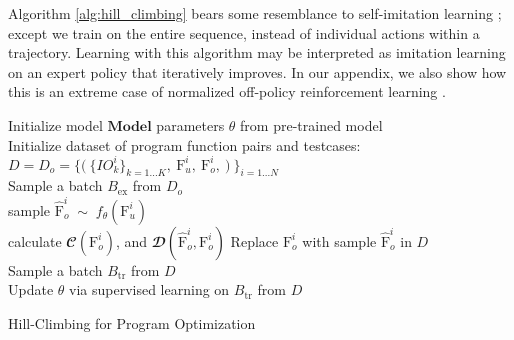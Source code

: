 \documentclass{article}
\begin{document}
Algorithm \ref{alg:hill_climbing} bears some resemblance to self-imitation learning \cite{oh2018self} ; except we train on the entire sequence, instead of individual actions within a trajectory. Learning with this algorithm may be interpreted as imitation learning on an expert policy that iteratively improves. In our appendix, we also show how this is an extreme case of normalized off-policy reinforcement learning . 

\begin{algorithm}
\label{alg:hill_climbing}
\begin{algorithmic}
\STATE Initialize model $\textbf{Model}$ parameters $\theta$ from pre-trained model \\
\STATE Initialize dataset of program function pairs and testcases: \\  
    $D = D_o =  \Big\{ \big( \
    \{IO_k^i\}_{k=1...K}, \
    \textrm{F}_{u}^i, \
    \textrm{F}_{o}^i, \
    \big) \ 
    \Big\}_{i=1...N}$ \\
 \WHILE{not converged}
  \STATE Sample a batch $B_{\mathrm{ex}}$ from $D_o$\\
    \STATE  sample $\hat{\textrm{F}}_{o}^i \; \sim \; f_{\theta}(\textrm{F}_{u}^i)$ \\
    \STATE calculate 
    $\mathbfcal{C}(\textrm{F}_{o}^i)$, 
    and $\mathbfcal{D} (\hat{\textrm{F}}_{o}^i, \textrm{F}_{o}^i)$ 
        \STATE  Replace $\textrm{F}_{o}^i$ with sample $\hat{\textrm{F}}_{o}^i$ in $D$ \\
    \ENDIF
  \ENDFOR
  \STATE Sample a batch $B_{\mathrm{tr}}$ from $D$\\
  \STATE Update $\theta$ via supervised learning on $B_{\mathrm{tr}}$ from $D$ \\
 \ENDWHILE\caption{Hill-Climbing for Program Optimization}
\end{algorithmic}
\end{algorithm}

\end{document}
